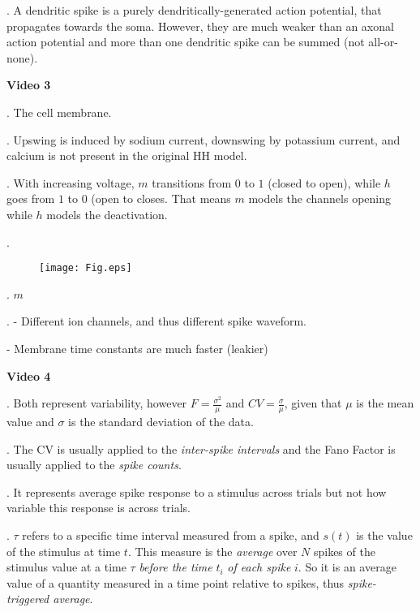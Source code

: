 \documentclass[a4paper,12pt]{article}
\begin{document}
. A dendritic spike is a purely dendritically-generated action potential, that propagates towards the soma. However, they are much weaker than an axonal action potential and more than one dendritic spike can be summed (not all-or-none).


\vspace{0.5cm}

\noindent\normalsize\textbf{Video 3}


. The cell membrane.

. Upswing is induced by sodium current, downswing by potassium current, and calcium is not present in the original HH model.

. With increasing voltage, $m$ transitions from $0$ to $1$ (closed to open), while $h$ goes from $1$ to $0$ (open to closes. That means $m$ models the channels opening while $h$ models the deactivation. 

. 

\begin{figure}[h]
\begin{centering}
\texttt{[image: Fig.eps]}
\end{centering}
\end{figure}


. $m$

. - Different ion channels, and thus different spike waveform.

- Membrane time constants are much faster (leakier)

\vspace{0.5cm}

\noindent\normalsize\textbf{Video 4}


. Both represent variability, however $F = \frac{\sigma^2}{\mu}$ and $CV = \frac{\sigma}{\mu}$, given that $\mu$ is the mean value and $\sigma$ is the standard deviation of the data.

. The CV is usually applied to the \emph{inter-spike intervals} and the Fano Factor is usually applied to the \emph{spike counts}.

. It represents average spike response to a stimulus across trials but not how variable this response is across trials.

. $\tau$ refers to a specific time interval measured from a spike, and $s(t)$ is the value of the stimulus at time $t$. This measure is the \emph{average} over $N$ spikes of the stimulus value at a time $\tau$ \emph{before the time} $t_i$ \emph{of each spike} $i$. So it is an average value of a quantity measured in a time point relative to spikes, thus \emph{spike-triggered average}. 
\end{document}
